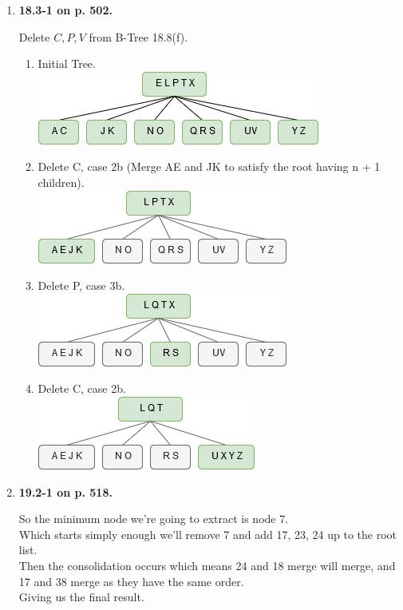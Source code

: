 \documentclass{article}
\begin{document}
\begin{enumerate}
    \item \textbf{18.3-1 on p. 502.}
    
    Delete ${C, P, V}$ from B-Tree 18.8(f).
    
    \begin{enumerate}
      \item Initial Tree.\\
      \includegraphics[scale=0.5]{11a.png}
      \item Delete C, case 2b (Merge AE and JK to satisfy the root having n + 1 children).\\
      \includegraphics[scale=0.5]{11b.png}
      \item Delete P, case 3b.\\
      \includegraphics[scale=0.5]{11c.png}
      \item Delete C, case 2b.\\
      \includegraphics[scale=0.5]{11d.png}            
    \end{enumerate}

    \item \textbf{19.2-1 on p. 518.}
    
    So the minimum node we're going to extract is node 7.\\
    Which starts simply enough we'll remove 7 and add 17, 23, 24 up to the root list.\\
    Then the consolidation occurs which means 24 and 18 merge will merge, and 17 and 38 merge as they have the same order.\\
    Giving us the final result.\\


\end{enumerate}
\end{document}
